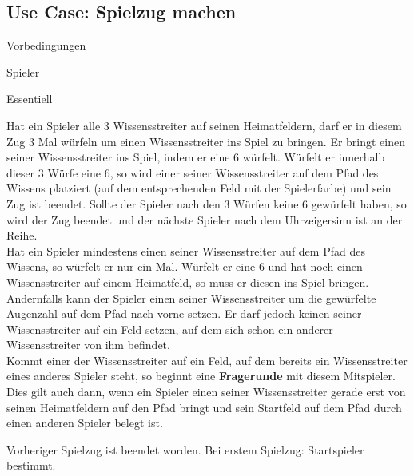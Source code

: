 \subsection{Use Case: Spielzug machen}
\begin{labeling}[:]{Vorbedingungen}
\item [Akteure] Spieler
\item [Priorität] Essentiell
\item [Beschreibung] Hat ein Spieler alle 3 Wissensstreiter auf seinen Heimatfeldern, darf er in diesem Zug 3 Mal würfeln um einen Wissensstreiter ins Spiel zu bringen. Er bringt einen seiner Wissensstreiter ins Spiel, indem er eine 6 würfelt. Würfelt er innerhalb dieser 3 Würfe eine 6, so wird einer seiner Wissensstreiter auf dem Pfad des Wissens platziert (auf dem entsprechenden Feld mit der Spielerfarbe) und sein Zug ist beendet. Sollte der Spieler nach den 3 Würfen keine 6 gewürfelt haben, so wird der Zug beendet und der nächste Spieler nach dem Uhrzeigersinn ist an der Reihe. \\
Hat ein Spieler mindestens einen seiner Wissensstreiter auf dem Pfad des Wissens, so würfelt er nur ein Mal. Würfelt er eine 6 und hat noch einen Wissensstreiter auf einem Heimatfeld, so muss er diesen ins Spiel bringen.
\\
Andernfalls kann der Spieler einen seiner Wissensstreiter um die gewürfelte Augenzahl auf dem Pfad nach vorne setzen. Er darf jedoch keinen seiner Wissensstreiter auf ein Feld setzen, auf dem sich schon ein anderer Wissensstreiter von ihm befindet.
\\
Kommt einer der Wissensstreiter auf ein Feld, auf dem bereits ein Wissensstreiter eines anderes Spieler steht, so beginnt eine \textbf{Fragerunde} mit diesem Mitspieler. Dies gilt auch dann, wenn ein Spieler einen seiner Wissensstreiter gerade erst von seinen Heimatfeldern auf den Pfad bringt und sein Startfeld auf dem Pfad durch einen anderen Spieler belegt ist.
\item [Vorbedingungen] Vorheriger Spielzug ist beendet worden. Bei erstem Spielzug: Startspieler bestimmt.
\item [Offene Punkte]
\end{labeling}

